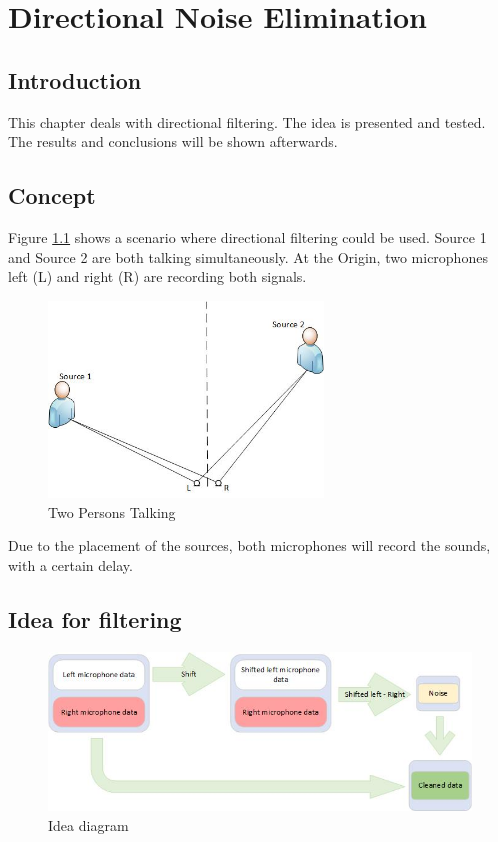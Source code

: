 \chapter{Directional Noise Elimination}\label{ch:directional}
\section{Introduction}
This chapter deals with directional filtering. The idea is presented and tested. The 
results and conclusions will be shown afterwards.
\section{Concept}
Figure \ref{fig:2sources} shows a scenario where directional filtering could be used.
Source 1 and Source 2 are both talking simultaneously. At the Origin, two microphones 
left (L) and right (R) are recording both signals.

\begin{figure}[htp]
	\centering
	\includegraphics[width=0.65\textwidth]{Illustrations/2sources.jpg}
	\caption{Two Persons Talking}
	\label{fig:2sources}
\end{figure}

Due to the placement of the sources, both microphones will record the sounds, with a 
certain delay.

\section{Idea for filtering}

\begin{figure}[htp]
	\centering
	\includegraphics[width=1\textwidth]{Illustrations/IdeaDiagram.jpg}
	\caption{Idea diagram}
	\label{fig:IdeaDiagram}
\end{figure}

